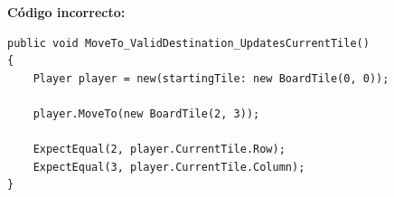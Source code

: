 \textbf{Código incorrecto:}
\begin{lstlisting}[style=csharpstyle]
public void MoveTo_ValidDestination_UpdatesCurrentTile()
{
    Player player = new(startingTile: new BoardTile(0, 0));

    player.MoveTo(new BoardTile(2, 3));

    ExpectEqual(2, player.CurrentTile.Row);
    ExpectEqual(3, player.CurrentTile.Column);
}
\end{lstlisting}
